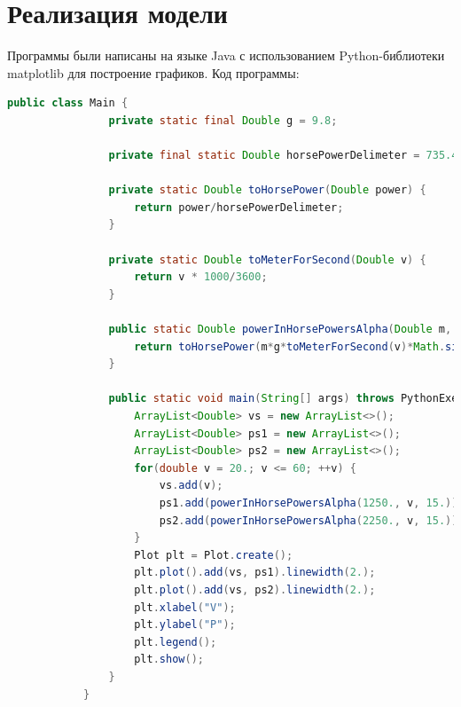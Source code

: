 \documentclass[a4paper, 14pt]{extarticle}
\begin{document}
	\section{Реализация модели}
		Программы были написаны на языке Java с использованием Python-библиотеки matplotlib для построение графиков.
						Код программы:
		\begin{lstlisting}[language=Java]
			public class Main {
				private static final Double g = 9.8;
				
				private final static Double horsePowerDelimeter = 735.499;
				
				private static Double toHorsePower(Double power) {
					return power/horsePowerDelimeter;
				}
				
				private static Double toMeterForSecond(Double v) {
					return v * 1000/3600;
				}
				
				public static Double powerInHorsePowersAlpha(Double m, Double v, Double alpha) {
					return toHorsePower(m*g*toMeterForSecond(v)*Math.sin(Math.toRadians(alpha)));
				}
				
				public static void main(String[] args) throws PythonExecutionException, IOException {
					ArrayList<Double> vs = new ArrayList<>();
					ArrayList<Double> ps1 = new ArrayList<>();
					ArrayList<Double> ps2 = new ArrayList<>();
					for(double v = 20.; v <= 60; ++v) {
						vs.add(v);
						ps1.add(powerInHorsePowersAlpha(1250., v, 15.));
						ps2.add(powerInHorsePowersAlpha(2250., v, 15.));
					}
					Plot plt = Plot.create();
					plt.plot().add(vs, ps1).linewidth(2.);
					plt.plot().add(vs, ps2).linewidth(2.);
					plt.xlabel("V");
					plt.ylabel("P");
					plt.legend();
					plt.show();
				}
			}
		\end{lstlisting}
		\pagebreak
\end{document}
